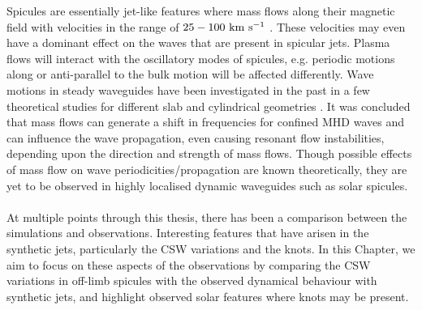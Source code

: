 \documentclass[12pt]{ociamthesis}
\newcommand{\kms}{~\rm{km ~s^{-1}}}
\newcommand{\np}{\\ \\}
\begin{document}
Spicules are essentially jet-like features where mass flows along their magnetic field with velocities in the range of $25-100\kms$  \citep{Beckers1972ARAA1073B, Sterling2000SoPh19679S, Pereira2012}. These velocities may even have a dominant effect on the waves that are present in spicular jets. Plasma flows will interact with the oscillatory modes of spicules, e.g. periodic motions along or anti-parallel to the bulk motion will be affected differently. Wave motions in steady waveguides have been investigated in the past in a few theoretical studies for different slab and cylindrical geometries \citep{Narayanan1991,nakariakov1995, terrahomem2003, soler2008}. It was concluded that mass flows can generate a shift in frequencies for confined MHD waves and can influence the wave propagation, even causing resonant flow instabilities, depending upon the direction and strength of mass flows. Though possible effects of mass flow on wave periodicities/propagation are known theoretically, they are yet to be observed in highly localised dynamic waveguides such as solar spicules. \np
%
At multiple points through this thesis, there has been a comparison between the simulations and observations. Interesting features that have arisen in the synthetic jets, particularly the CSW variations and the knots. In this Chapter, we aim to focus on these aspects of the observations by comparing the CSW variations in off-limb spicules with the observed dynamical behaviour with synthetic jets, and highlight observed solar features where knots may be present. \np
\end{document}
